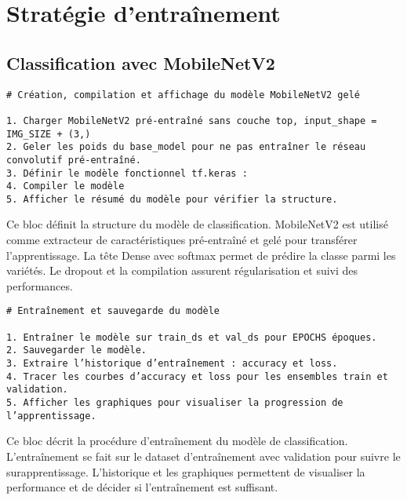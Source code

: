 \section{Stratégie d’entraînement}
\label{sec:entrainement}

\subsection{Classification avec MobileNetV2}
{\footnotesize
	\begin{verbatim}
# Création, compilation et affichage du modèle MobileNetV2 gelé

1. Charger MobileNetV2 pré-entraîné sans couche top, input_shape = IMG_SIZE + (3,)
2. Geler les poids du base_model pour ne pas entraîner le réseau convolutif pré-entraîné.
3. Définir le modèle fonctionnel tf.keras :
4. Compiler le modèle
5. Afficher le résumé du modèle pour vérifier la structure.
\end{verbatim}}

Ce bloc définit la structure du modèle de classification. MobileNetV2 est utilisé comme extracteur de caractéristiques pré-entraîné et gelé pour transférer l’apprentissage. La tête Dense avec softmax permet de prédire la classe parmi les variétés. Le dropout et la compilation assurent régularisation et suivi des performances.

\begin{verbatim}
# Entraînement et sauvegarde du modèle

1. Entraîner le modèle sur train_ds et val_ds pour EPOCHS époques.
2. Sauvegarder le modèle.
3. Extraire l’historique d’entraînement : accuracy et loss.
4. Tracer les courbes d’accuracy et loss pour les ensembles train et validation.
5. Afficher les graphiques pour visualiser la progression de l’apprentissage.
\end{verbatim}

Ce bloc décrit la procédure d’entraînement du modèle de classification. L’entraînement se fait sur le dataset d’entraînement avec validation pour suivre le surapprentissage. L’historique et les graphiques permettent de visualiser la performance et de décider si l’entraînement est suffisant.

